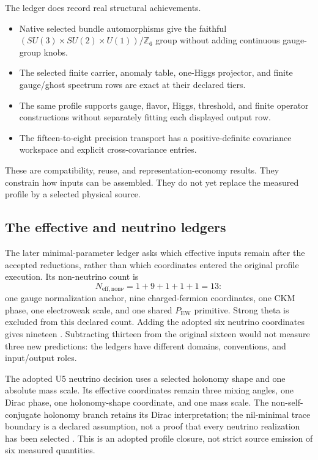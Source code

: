 \documentclass[11pt]{article}
\newcommand{\PEW}{P_{\mathrm{EW}}}
\begin{document}
The ledger does record real structural achievements.
\begin{itemize}
\item Native selected bundle automorphisms give the faithful
      \((SU(3)\times SU(2)\times U(1))/\mathbb Z_6\) group without adding
      continuous gauge-group knobs.
\item The selected finite carrier, anomaly table, one-Higgs projector, and
      finite gauge/ghost spectrum rows are exact at their declared tiers.
\item The same profile supports gauge, flavor, Higgs, threshold, and finite
      operator constructions without separately fitting each displayed
      output row.
\item The fifteen-to-eight precision transport has a positive-definite
      covariance workspace and explicit cross-covariance entries.
\end{itemize}

These are compatibility, reuse, and representation-economy results. They
constrain how inputs can be assembled. They do not yet replace the measured
profile by a selected physical source.

\subsection{The effective and neutrino ledgers}
\label{sec:effective-ledger}

The later minimal-parameter ledger asks which effective inputs remain after
the accepted reductions, rather than which coordinates entered the original
profile execution. Its non-neutrino count is
\[
N_{\mathrm{eff,non\nu}}=1+9+1+1+1=13:
\]
one gauge normalization anchor, nine charged-fermion coordinates, one CKM
phase, one electroweak scale, and one shared \(\PEW\) primitive. Strong
theta is excluded from this declared count. Adding the adopted six neutrino
coordinates gives nineteen \cite{FrozenEffectiveLedger}. Subtracting thirteen
from the original sixteen would not measure three new predictions: the
ledgers have different domains, conventions, and input/output roles.

The adopted U5 neutrino decision uses a selected holonomy shape and one
absolute mass scale. Its effective coordinates remain three mixing angles,
one Dirac phase, one holonomy-shape coordinate, and one mass scale. The
non-self-conjugate holonomy branch retains its Dirac interpretation; the
nil-minimal trace boundary is a declared assumption, not a proof that every
neutrino realization has been selected \cite{FrozenU5}. This is an adopted
profile closure, not strict source emission of six measured quantities.
\end{document}
